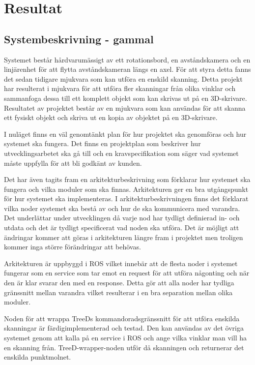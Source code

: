 \chapter{Resultat}
\label{cha:results}

\section{Systembeskrivning - gammal}

Systemet består hårdvarumässigt av ett rotationsbord, en avståndskamera och en linjärenhet för att flytta avståndskameran längs en axel. För att styra detta fanns det sedan tidigare mjukvara som kan utföra en enskild skanning. Detta projekt har resulterat i mjukvara för att utföra fler skanningar från olika vinklar och sammanfoga dessa till ett komplett objekt som kan skrivas ut på en 3D-skrivare. Resultatet av projektet består av en mjukvara som kan användas för att skanna ett fysiskt objekt och skriva ut en kopia av objektet på en 3D-skrivare.

I nuläget finns en väl genomtänkt plan för hur projektet ska genomföras och hur systemet ska fungera. Det finns en projektplan som beskriver hur utvecklingsarbetet ska gå till och en kravspecifikation som säger vad systemet måste uppfylla för att bli godkänt av kunden.

Det har även tagits fram en arkitekturbeskrivning som förklarar hur systemet ska fungera och vilka moduler som ska finnas. Arkitekturen ger en bra utgångspunkt för hur systemet ska implementeras. I arkitekturbeskrivningen finns det förklarat vilka noder systemet ska bestå av och hur de ska kommunicera med varandra. Det underlättar under utvecklingen då varje nod har tydligt definierad in- och utdata och det är tydligt specificerat vad noden ska utföra. Det är möjligt att ändringar kommer att göras i arkitekturen längre fram i projektet men troligen kommer inga större förändringar att behövas.

Arkitekturen är uppbyggd i ROS vilket innebär att de flesta noder i systemet fungerar som en service som tar emot en request för att utföra någonting och när den är klar svarar den med en response. Detta gör att alla noder har tydliga gränssnitt mellan varandra vilket resulterar i en bra separation mellan olika moduler.

Noden för att wrappa TreeDs kommandoradsgränssnitt för att utföra enskilda skanningar är färdigimplementerad och testad. Den kan användas av det övriga systemet genom att kalla på en service i ROS och ange vilka vinklar man vill ha en skanning från. TreeD-wrapper-noden utför då skanningen och returnerar det enskilda punktmolnet.

